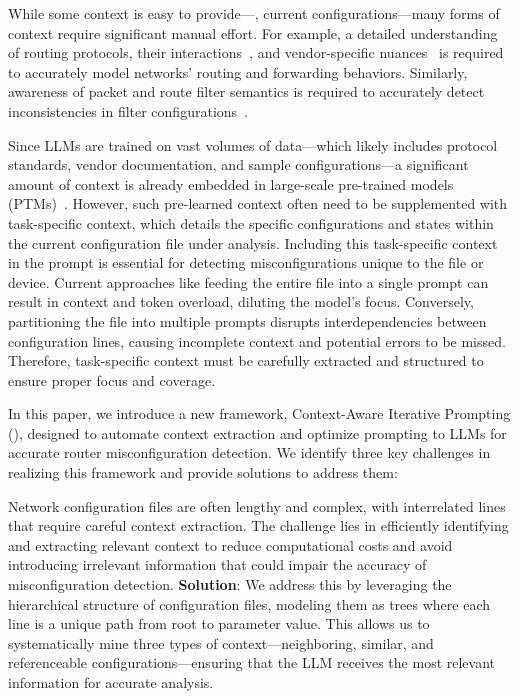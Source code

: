 While some context is easy to provide---\eg, current config\-urations---many forms of context require significant manual effort. For example, a detailed understanding of routing protocols, their interactions~\cite{le2007rr}, and vendor-specific nuances~\cite{ye2020hoyan} is required to accurately model networks' routing and forwarding behaviors. Similarly, awareness of packet and route filter semantics is required to accurately detect inconsistencies in filter configurations~\cite{kakarla2020finding}.

Since LLMs are trained on vast volumes of data---which likely includes protocol standards, vendor documentation, and sample configurations---a significant amount of context is already embedded in large-scale pre-trained models (PTMs)~\cite{qiu2020pre}. However, such pre-learned context often need to be supplemented with task-specific context, which details the specific configurations and states within the current configuration file under analysis. Including this task-specific context in the prompt is essential for detecting misconfigurations unique to the file or device.
Current approaches like feeding the entire file into a single prompt can result in context and token overload, diluting the model's focus. Conversely, partitioning the file into multiple prompts disrupts interdependencies between configuration lines, causing incomplete context and potential errors to be missed. Therefore, task-specific context must be carefully extracted and structured to ensure proper focus and coverage.

In this paper, we introduce a new framework, Context-Aware Iterative Prompting (\sysname{}), designed to automate context extraction and optimize prompting to LLMs for accurate router misconfiguration detection. We identify three key challenges in realizing this framework and provide solutions to address them:

Network configuration files are often lengthy and complex, with interrelated lines that require careful context extraction. The challenge lies in efficiently identifying and extracting relevant context to reduce computational costs and avoid introducing irrelevant information that could impair the accuracy of misconfiguration detection. \textbf{Solution}: We address this by leveraging the hierarchical structure of configuration files, modeling them as trees where each line is a unique path from root to parameter value. This allows us to systematically mine three types of context—neighboring, similar, and referenceable configurations—ensuring that the LLM receives the most relevant information for accurate analysis.

